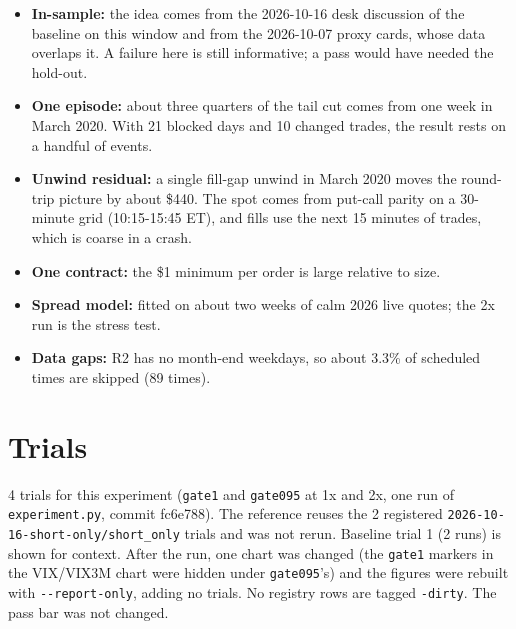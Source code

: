 \documentclass{article}
\begin{document}
\begin{itemize}

\item \textbf{In-sample:} the idea comes from the 2026-10-16 desk discussion of the baseline on this window and from the 2026-10-07 proxy cards, whose data overlaps it. A failure here is still informative; a pass would have needed the hold-out.

\item \textbf{One episode:} about three quarters of the tail cut comes from one week in March 2020. With 21 blocked days and 10 changed trades, the result rests on a handful of events.

\item \textbf{Unwind residual:} a single fill-gap unwind in March 2020 moves the round-trip picture by about \$440. The spot comes from put-call parity on a 30-minute grid (10:15-15:45 ET), and fills use the next 15 minutes of trades, which is coarse in a crash.

\item \textbf{One contract:} the \$1 minimum per order is large relative to size.

\item \textbf{Spread model:} fitted on about two weeks of calm 2026 live quotes; the 2x run is the stress test.

\item \textbf{Data gaps:} R2 has no month-end weekdays, so about 3.3\% of scheduled times are skipped (89 times).

\end{itemize}

\section{Trials}

4 trials for this experiment (\texttt{gate1} and \texttt{gate095} at 1x and 2x, one run of \texttt{experiment.\allowbreak{}py}, commit fc6e788). The reference reuses the 2 registered \texttt{2026-\allowbreak{}10-\allowbreak{}16-\allowbreak{}short-\allowbreak{}only/\allowbreak{}short\_\allowbreak{}only} trials and was not rerun. Baseline trial 1 (2 runs) is shown for context. After the run, one chart was changed (the \texttt{gate1} markers in the VIX/\allowbreak{}VIX3M chart were hidden under \texttt{gate095}'s) and the figures were rebuilt with \texttt{-\allowbreak{}-\allowbreak{}report-\allowbreak{}only}, adding no trials. No registry rows are tagged \texttt{-\allowbreak{}dirty}. The pass bar was not changed.
\end{document}
